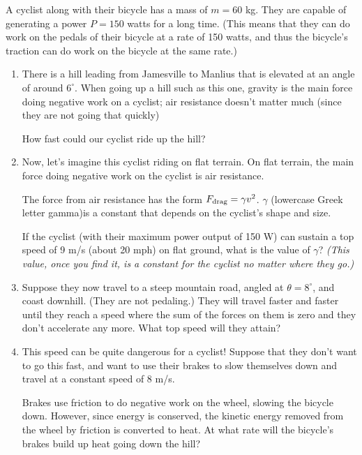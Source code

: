 \documentclass[12pt]{article}
\begin{document}
A cyclist along with their bicycle has a mass of $m=60$ kg. They are capable of generating a power $P=150$ watts for a long time. (This means that they can do work on the pedals of their bicycle at a rate of 150 watts, and thus the bicycle's traction can do work on the bicycle at the same rate.)

\begin{enumerate}
\item There is a hill leading from Jamesville to Manlius that is elevated at an angle of around $6^\circ$. When going up a hill such as this one, gravity is the main force doing negative work on a cyclist; air resistance doesn't matter much (since they are not going that quickly)

How fast could our cyclist ride up the hill?


\vspace{2in}

\item Now, let's imagine this cyclist riding on flat terrain. On flat terrain, the main force doing negative work on the cyclist is air resistance.

The force from air resistance has the form $F_{\rm drag} = \gamma v^2$. $\gamma$ (lowercase Greek letter gamma)is a constant that depends on the cyclist's shape and size.

If the cyclist (with their maximum power output of 150 W) can sustain a top speed of 9 m/s (about 20 mph) on flat ground, what is the value of $\gamma$? {\it (This value, once you find it, is a constant for the cyclist no matter where they go.)}

\vspace{2in}
\newpage
\item Suppose they now travel to a steep mountain road, angled at $\theta=8^\circ$, and coast downhill. (They are not pedaling.) They will travel faster and faster until they reach a speed where the sum of the forces on them is zero and they don't accelerate any more. What top speed will they attain? 

\vspace{3in}

\item This speed can be quite dangerous for a cyclist! Suppose that they don't want to go this fast, and want to use their brakes to slow themselves down and travel at a constant speed of 8 m/s.

Brakes use friction to do negative work on the wheel, slowing the bicycle down. However, since energy is conserved, the kinetic energy removed from the wheel by friction is converted to heat. At what rate will the bicycle's brakes build up heat going down the hill?


\end{enumerate}
\end{document}
